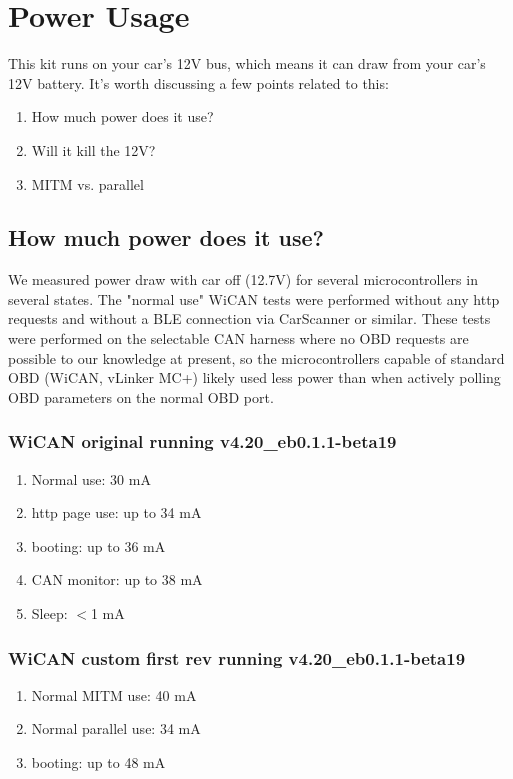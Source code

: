 \documentclass[superscriptaddress,onecolumn,floatfix]{revtex4-2}
\begin{document}
\section{Power Usage}
This kit runs on your car's 12V bus, which means it can draw from your car's 12V battery. It's worth discussing a few points related to this:
\begin{enumerate}
  \item How much power does it use?
  \item Will it kill the 12V?
  \item MITM vs. parallel
\end{enumerate}

\subsection{How much power does it use?}

We measured power draw with car off (12.7V) for several microcontrollers in several states. The "normal use" WiCAN tests were performed without any http requests and without a BLE connection via CarScanner or similar. These tests were performed on the selectable CAN harness where no OBD requests are possible to our knowledge at present, so the microcontrollers capable of standard OBD (WiCAN, vLinker MC+) likely used less power than when actively polling OBD parameters on the normal OBD port. 

\subsubsection{WiCAN original running v4.20\_eb0.1.1-beta19}
\begin{enumerate}
  \item{Normal use:} 30 mA
  \item{http page use:} up to 34 mA
  \item{booting:} up to 36 mA
  \item{CAN monitor:} up to 38 mA
  \item{Sleep:} $<$1 mA
\end{enumerate}

\subsubsection{WiCAN custom first rev running v4.20\_eb0.1.1-beta19}
\begin{enumerate}
  \item{Normal MITM use:} 40 mA
  \item{Normal parallel use:} 34 mA
  \item{booting:} up to 48 mA
\end{enumerate}
\end{document}
